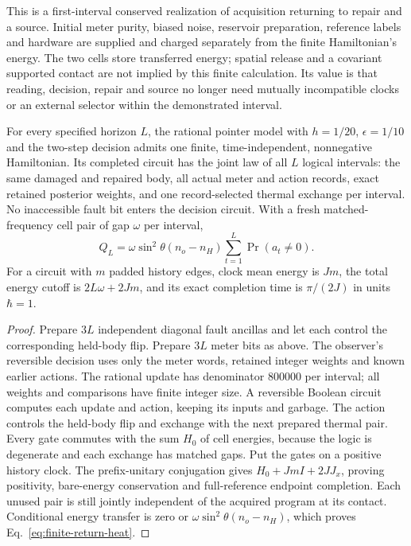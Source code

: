 This is a first-interval conserved realization of acquisition returning
to repair and a source. Initial
meter purity, biased noise, reservoir preparation, reference labels
and hardware are supplied and charged separately from the finite
Hamiltonian's energy. The two cells store transferred energy; spatial
release and a covariant supported contact are not implied by this
finite calculation. Its value is that reading, decision, repair and
source no longer need mutually incompatible clocks or an external
selector within the demonstrated interval.

\begin{proposition}
\label{prop:finite-continuing-return}
For every specified horizon $L$, the rational pointer model with
$h=1/20$, $\epsilon=1/10$ and the two-step decision admits one finite,
time-independent, nonnegative Hamiltonian. Its completed circuit has
the joint law of all $L$ logical intervals: the same damaged and
repaired body, all actual meter and action records, exact retained
posterior weights, and one record-selected thermal exchange per
interval. No inaccessible fault bit enters the decision circuit.
With a fresh matched-frequency cell pair of gap $\omega$ per interval,
\begin{equation}\label{eq:finite-return-heat}
 Q_L=\omega\sin^2\theta(n_o-n_H)
       \sum_{t=1}^L\Pr(a_t\ne0).
\end{equation}
For a circuit with $m$ padded history edges, clock mean energy is
$Jm$, the total energy cutoff is $2L\omega+2Jm$, and its exact
completion time is $\pi/(2J)$ in units $\hbar=1$.
\end{proposition}
\begin{proof}
Prepare $3L$ independent diagonal fault ancillas and let each control
the corresponding held-body flip. Prepare $3L$ meter bits as above.
The observer's reversible decision uses only the meter words, retained
integer weights and known earlier actions. The rational update has
denominator $800000$ per interval; all weights and comparisons have
finite integer size. A reversible Boolean circuit computes each update
and action, keeping its inputs and garbage. The action controls the
held-body flip and exchange with the next prepared thermal pair.
Every gate commutes with the sum $H_0$ of cell energies, because the
logic is degenerate and each exchange has matched gaps. Put the gates
on a positive history clock. The prefix-unitary conjugation gives
$H_0+JmI+2JJ_x$, proving positivity, bare-energy conservation and
full-reference endpoint completion. Each unused pair is still jointly
independent of the acquired program at its contact. Conditional energy
transfer is zero or $\omega\sin^2\theta(n_o-n_H)$, which proves
Eq.~\eqref{eq:finite-return-heat}.
\end{proof}

